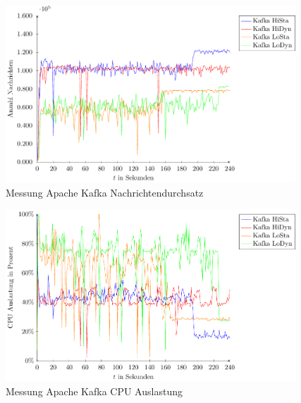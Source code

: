 \begin{figure}
\includegraphics[width=0.97\textwidth]{plots/messungKafkaDurchsatz.pdf}
\caption{Messung Apache Kafka Nachrichtendurchsatz
\label{fig:messungKafkaNd}}
\end{figure}
\begin{figure}
\includegraphics[width=0.97\textwidth]{plots/messungKafkaCpu.pdf}
\caption{Messung Apache Kafka CPU Auslastung
\label{fig:messungKafkaCpu}}
\end{figure}


